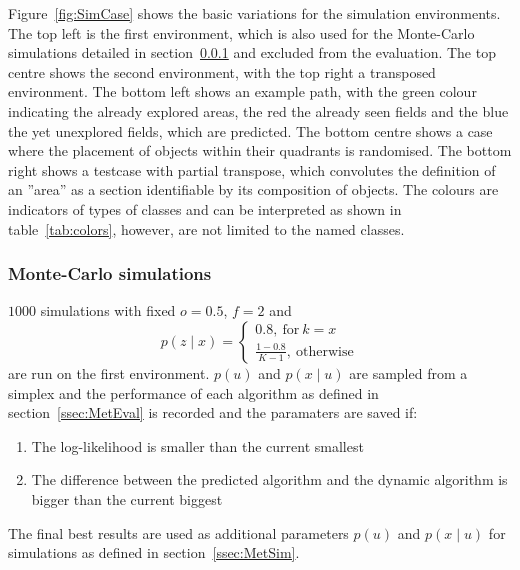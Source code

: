 \documentclass[twocolumn,letterpaper]{IEEEAerospaceCLS}  %
\begin{document}
Figure~\ref{fig:SimCase} shows the basic variations for the simulation environments. The top left is the first environment, which is also used for the Monte-Carlo simulations detailed in section~\ref{ssec:MetMC} and excluded from the evaluation. The top centre shows the second environment, with the top right a transposed environment. The bottom left shows an example path, with the green colour indicating the already explored areas, the red the already seen fields and the blue the yet unexplored fields, which are predicted. The bottom centre shows a case where the placement of objects within their quadrants is randomised. The bottom right shows a testcase with partial transpose, which convolutes the definition of an ''area'' as a section identifiable by its composition of objects. The colours are indicators of types of classes and can be interpreted as shown in table~\ref{tab:colors}, however, are not limited to the named classes.
\subsubsection{Monte-Carlo simulations} \label{ssec:MetMC}
$1000$ simulations with fixed $o=0.5$, $f=2$ and
\begin{equation} \nonumber
    p(z\mid x)=
    \begin{cases}
        0.8,~\text{for}~k=x \\
        \frac{1-0.8}{K-1},~\text{otherwise}
    \end{cases}
\end{equation}
are run on the first environment. $p(u)$ and $p(x\mid u)$ are sampled from a simplex and the performance of each algorithm as defined in section~\ref{ssec:MetEval} is recorded and the paramaters are saved if:
\begin{enumerate}
    \item The log-likelihood is smaller than the current smallest
    \item The difference between the predicted algorithm and the dynamic algorithm is bigger than the current biggest
\end{enumerate}
The final best results are used as additional parameters $p(u)$ and $p(x\mid u)$ for simulations as defined in section~\ref{ssec:MetSim}.
\end{document}
